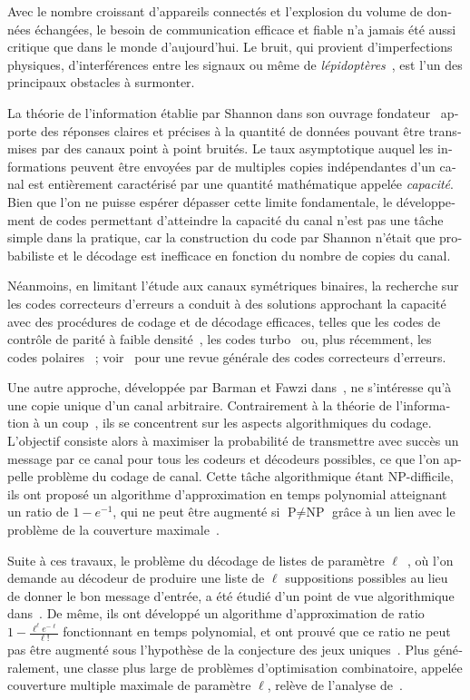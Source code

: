 \begin{otherlanguage}{french}
Avec le nombre croissant d'appareils connectés et l'explosion du volume de données échangées, le besoin de communication efficace et fiable n'a jamais été aussi critique que dans le monde d'aujourd'hui. Le bruit, qui provient d'imperfections physiques, d'interférences entre les signaux ou même de \emph{lépidoptères}~\cite{Hopper81}, est l'un des principaux obstacles à surmonter.

La théorie de l'information établie par Shannon dans son ouvrage fondateur~\cite{Shannon48} apporte des réponses claires et précises à la quantité de données pouvant être transmises par des canaux point à point bruités. Le taux asymptotique auquel les informations peuvent être envoyées par de multiples copies indépendantes d'un canal est entièrement caractérisé par une quantité mathématique appelée \emph{capacité}. Bien que l'on ne puisse espérer dépasser cette limite fondamentale, le développement de codes permettant d'atteindre la capacité du canal n'est pas une tâche simple dans la pratique, car la construction du code par Shannon n'était que probabiliste et le décodage est inefficace en fonction du nombre de copies du canal.

Néanmoins, en limitant l'étude aux canaux symétriques binaires, la recherche sur les codes correcteurs d'erreurs a conduit à des solutions approchant la capacité avec des procédures de codage et de décodage efficaces, telles que les codes de contrôle de parité à faible densité~\cite{Gallager62}, les codes turbo~\cite{BG96} ou, plus récemment, les codes polaires~\cite{Arikan09} ; voir~\cite{RU08} pour une revue générale des codes correcteurs d'erreurs.

Une autre approche, développée par Barman et Fawzi dans~\cite{BF18}, ne s'intéresse qu'à une copie unique d'un canal arbitraire. Contrairement à la théorie de l'information à un coup~\cite{RWW06,Tomamichel12}, ils se concentrent sur les aspects algorithmiques du codage. L'objectif consiste alors à maximiser la probabilité de transmettre avec succès un message par ce canal pour tous les codeurs et décodeurs possibles, ce que l'on appelle problème du codage de canal. Cette tâche algorithmique étant \textrm{NP}-difficile, ils ont proposé un algorithme d'approximation en temps polynomial atteignant un ratio de $1-e^{-1}$, qui ne peut être augmenté si $\textrm{P}\not=\textrm{NP}$ grâce à un lien avec le problème de la couverture maximale~\cite{Feige98}.

Suite à ces travaux, le problème du décodage de listes de paramètre $\ell$~\cite{Elias57,Wozencraft58}, où l'on demande au décodeur de produire une liste de $\ell$ suppositions possibles au lieu de donner le bon message d'entrée, a été étudié d'un point de vue algorithmique dans~\cite{BFGG20}. De même, ils ont développé un algorithme d'approximation de ratio $1-\frac{\ell^{\ell}e^{-\ell}}{\ell!}$ fonctionnant en temps polynomial, et ont prouvé que ce ratio ne peut pas être augmenté sous l'hypothèse de la conjecture des jeux uniques~\cite{Khot02}. Plus généralement, une classe plus large de problèmes d'optimisation combinatoire, appelée couverture multiple maximale de paramètre $\ell$, relève de l'analyse de~\cite{BFGG20}.


\end{otherlanguage}
